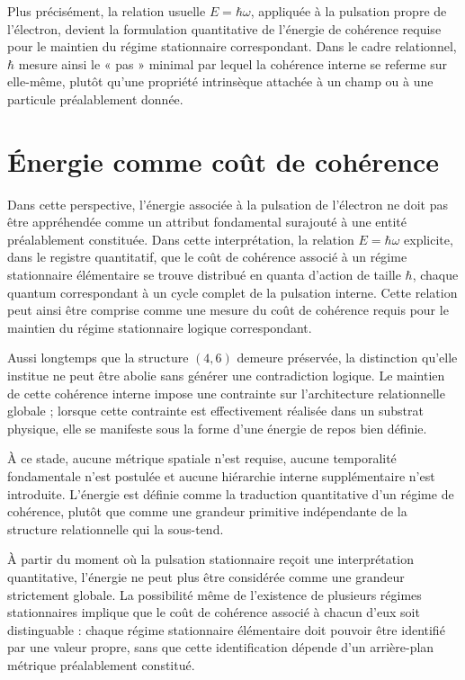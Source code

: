 \documentclass[11pt,a4paper]{article}
\begin{document}
Plus précisément, la relation usuelle \(E = \hbar \omega\), appliquée à la pulsation propre de l’électron, devient la formulation quantitative de l’énergie de cohérence requise pour le maintien du régime stationnaire correspondant. Dans le cadre relationnel, \(\hbar\) mesure ainsi le « pas » minimal par lequel la cohérence interne se referme sur elle-même, plutôt qu’une propriété intrinsèque attachée à un champ ou à une particule préalablement donnée.

\section{Énergie comme coût de cohérence}

Dans cette perspective, l’énergie associée à la pulsation de l’électron ne doit pas être appréhendée comme un attribut fondamental surajouté à une entité préalablement constituée. Dans cette interprétation, la relation \(E = \hbar \omega\) explicite, dans le registre quantitatif, que le coût de cohérence associé à un régime stationnaire élémentaire se trouve distribué en quanta d’action de taille \(\hbar\), chaque quantum correspondant à un cycle complet de la pulsation interne. Cette relation peut ainsi être comprise comme une mesure du coût de cohérence requis pour le maintien du régime stationnaire logique correspondant.

Aussi longtemps que la structure \(\left(4,6\right)\) demeure préservée, la distinction qu’elle institue ne peut être abolie sans générer une contradiction logique. Le maintien de cette cohérence interne impose une contrainte sur l’architecture relationnelle globale ; lorsque cette contrainte est effectivement réalisée dans un substrat physique, elle se manifeste sous la forme d’une énergie de repos bien définie.

À ce stade, aucune métrique spatiale n’est requise, aucune temporalité fondamentale n’est postulée et aucune hiérarchie interne supplémentaire n’est introduite. L’énergie est définie comme la traduction quantitative d’un régime de cohérence, plutôt que comme une grandeur primitive indépendante de la structure relationnelle qui la sous-tend.

À partir du moment où la pulsation stationnaire reçoit une interprétation quantitative, l’énergie ne peut plus être considérée comme une grandeur strictement globale. La possibilité même de l’existence de plusieurs régimes stationnaires implique que le coût de cohérence associé à chacun d’eux soit distinguable : chaque régime stationnaire élémentaire doit pouvoir être identifié par une valeur propre, sans que cette identification dépende d’un arrière-plan métrique préalablement constitué.
\end{document}
